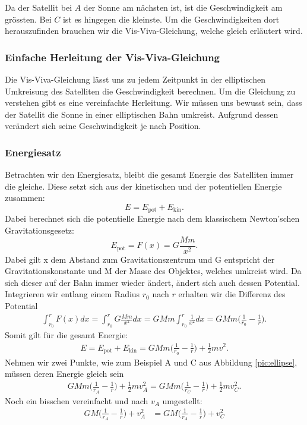 \begin{refsection}
Da der Satellit bei $A$ der Sonne am nächsten ist, ist die Geschwindigkeit am grössten. Bei $C$ ist es hingegen die kleinste. Um die Geschwindigkeiten dort herauszufinden brauchen wir die Vis-Viva-Gleichung, welche gleich erläutert wird.

\subsubsection{Einfache Herleitung der Vis-Viva-Gleichung}
Die Vis-Viva-Gleichung lässt uns zu jedem Zeitpunkt in der elliptischen Umkreisung des Satelliten die Geschwindigkeit berechnen. Um die Gleichung zu verstehen gibt es eine vereinfachte Herleitung. Wir müssen uns bewusst sein, dass der Satellit die Sonne in einer elliptischen Bahn umkreist. Aufgrund dessen verändert sich seine Geschwindigkeit je nach Position. 

\subsubsection{Energiesatz}
Betrachten wir den Energiesatz, bleibt die gesamt Energie des Satelliten immer die gleiche. Diese setzt sich aus der kinetischen und der potentiellen Energie zusammen:
\begin{equation}
E = E_{\text{pot}} + E_{\text{kin}}.
\end{equation}
Dabei berechnet sich die potentielle Energie nach dem klassischem Newton'schen Gravitationsgesetz:
\begin{equation}
E_{\text{pot}} = F(x) = G\frac{Mm}{x^2}.
\end{equation}
Dabei gilt x dem Abstand zum Gravitationszentrum und G entspricht der Gravitationskonstante und M der Masse des Objektes, welches umkreist wird. Da sich dieser auf der Bahn immer wieder ändert, ändert sich auch dessen Potential. Integrieren wir entlang einem Radius $r_0$ nach $r$ erhalten wir die Differenz des Potential
\begin{align*}
\int_{r_0}^{r} F(x) dx
=
\int_{r_0}^{r} G\frac{Mm}{x^2} dx
=
GMm \int_{r_0}^{r} \frac{1}{x^2} dx
=
GMm \biggl( \frac{1}{r_0} - \frac{1}{r}\biggr).
\end{align*}
Somit gilt für die gesamt Energie:
\begin{align*}
E = E_{\text{pot}} + E_{\text{kin}} = GMm \biggl( \frac{1}{r_0} - \frac{1}{r}\biggr) + \frac{1}{2}mv^2.
\end{align*}
Nehmen wir zwei Punkte, wie zum Beispiel A und C aus Abbildung \ref{pic:ellipse}, müssen deren Energie gleich sein
\begin{align*}
GMm \biggl( \frac{1}{r_A} - \frac{1}{r}\biggr) + \frac{1}{2}mv_A^2 = GMm \biggr( \frac{1}{r_C} - \frac{1}{r}\biggr) + \frac{1}{2}mv_C^2.
\end{align*}
Noch ein bisschen vereinfacht und nach $v_A$ umgestellt:
\begin{align*}
GM \biggl( \frac{1}{r_A} - \frac{1}{r}\biggr) + v_A^2 &= GM \biggr( \frac{1}{r_A} - \frac{1}{r}\biggr) + v_C^2
\end{align*}


\end{refsection}
